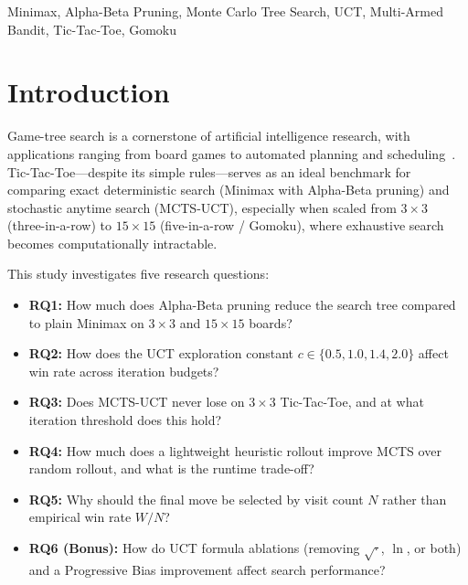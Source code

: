 \documentclass[conference]{IEEEtran}
\begin{document}
\begin{IEEEkeywords}
Minimax, Alpha-Beta Pruning, Monte Carlo Tree Search, UCT, Multi-Armed Bandit, Tic-Tac-Toe, Gomoku
\end{IEEEkeywords}

\section{Introduction}
Game-tree search is a cornerstone of artificial intelligence research, with applications ranging from board games to automated planning and scheduling~\cite{russell2020}. Tic-Tac-Toe---despite its simple rules---serves as an ideal benchmark for comparing exact deterministic search (Minimax with Alpha-Beta pruning) and stochastic anytime search (MCTS-UCT), especially when scaled from $3\times 3$ (three-in-a-row) to $15\times 15$ (five-in-a-row / Gomoku), where exhaustive search becomes computationally intractable.

This study investigates five research questions:
\begin{itemize}
    \item \textbf{RQ1:} How much does Alpha-Beta pruning reduce the search tree compared to plain Minimax on $3\times 3$ and $15\times 15$ boards?
    \item \textbf{RQ2:} How does the UCT exploration constant $c \in \{0.5, 1.0, 1.4, 2.0\}$ affect win rate across iteration budgets?
    \item \textbf{RQ3:} Does MCTS-UCT never lose on $3\times 3$ Tic-Tac-Toe, and at what iteration threshold does this hold?
    \item \textbf{RQ4:} How much does a lightweight heuristic rollout improve MCTS over random rollout, and what is the runtime trade-off?
    \item \textbf{RQ5:} Why should the final move be selected by visit count $N$ rather than empirical win rate $W/N$?
    \item \textbf{RQ6 (Bonus):} How do UCT formula ablations (removing $\sqrt{\cdot}$, $\ln$, or both) and a Progressive Bias improvement affect search performance?
\end{itemize}
\end{document}

